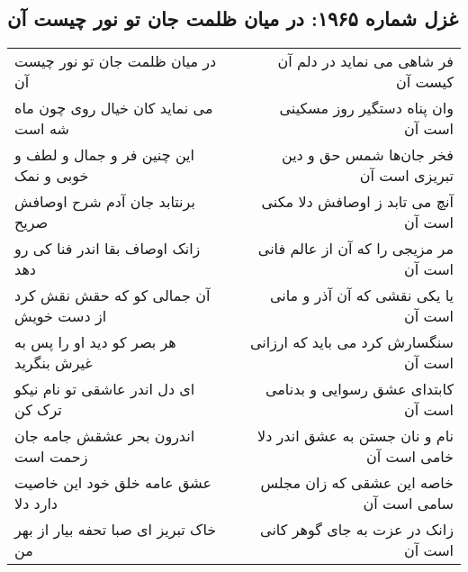 \begin{center}
\section*{غزل شماره ۱۹۶۵: در میان ظلمت جان تو نور چیست آن}
\label{sec:1965}
\begin{longtable}{l p{0.5cm} r}
در میان ظلمت جان تو نور چیست آن
&&
فر شاهی می نماید در دلم آن کیست آن
\\
می نماید کان خیال روی چون ماه شه است
&&
وان پناه دستگیر روز مسکینی است آن
\\
این چنین فر و جمال و لطف و خوبی و نمک
&&
فخر جان‌ها شمس حق و دین تبریزی است آن
\\
برنتابد جان آدم شرح اوصافش صریح
&&
آنچ می تابد ز اوصافش دلا مکنی است آن
\\
زانک اوصاف بقا اندر فنا کی رو دهد
&&
مر مزیجی را که آن از عالم فانی است آن
\\
آن جمالی کو که حقش نقش کرد از دست خویش
&&
یا یکی نقشی که آن آذر و مانی است آن
\\
هر بصر کو دید او را پس به غیرش بنگرید
&&
سنگسارش کرد می باید که ارزانی است آن
\\
ای دل اندر عاشقی تو نام نیکو ترک کن
&&
کابتدای عشق رسوایی و بدنامی است آن
\\
اندرون بحر عشقش جامه جان زحمت است
&&
نام و نان جستن به عشق اندر دلا خامی است آن
\\
عشق عامه خلق خود این خاصیت دارد دلا
&&
خاصه این عشقی که زان مجلس سامی است آن
\\
خاک تبریز ای صبا تحفه بیار از بهر من
&&
زانک در عزت به جای گوهر کانی است آن
\\
\end{longtable}
\end{center}

